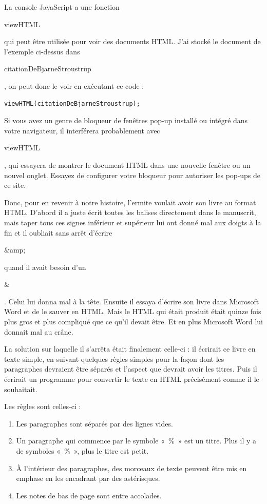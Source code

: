 \documentclass{FramateX}
\renewcommand{\texttt}[1]{\begin{sffamily}{#1}\end{sffamily}}
\begin{document}
\begin{center}\end{center}

La console JavaScript a une fonction \texttt{viewHTML} qui peut être
utilisée pour voir des documents HTML. J'ai stocké le document de
l'exemple ci-dessus dans \texttt{citationDeBjarneStroustrup}, on peut
donc le voir en exécutant ce code :

\begin{lstlisting}
viewHTML(citationDeBjarneStroustrup);
\end{lstlisting}
Si vous avez un genre de bloqueur de fenêtres pop-up installé ou intégré
dans votre navigateur, il interférera probablement avec
\texttt{viewHTML}, qui essayera de montrer le document HTML dans une
nouvelle fenêtre ou un nouvel onglet. Essayez de configurer votre
bloqueur pour autoriser les pop-ups de ce site.

\begin{center}\end{center}

Donc, pour en revenir à notre histoire, l'ermite voulait avoir son livre
au format HTML. D'abord il a juste écrit toutes les balises directement
dans le manuscrit, mais taper tous ces signes inférieur et supérieur lui
ont donné mal aux doigts à la fin et il oubliait sans arrêt d'écrire
\texttt{\&amp;} quand il avait besoin d'un \texttt{\&}. Celui lui donna
mal à la tête. Ensuite il essaya d'écrire son livre dans Microsoft Word
et de le sauver en HTML. Mais le HTML qui était produit était quinze
fois plus gros et plus compliqué que ce qu'il devait être. Et en plus
Microsoft Word lui donnait mal au crâne.

La solution sur laquelle il s'arrêta était finalement celle-ci : il
écrirait ce livre en texte simple, en suivant quelques règles simples
pour la façon dont les paragraphes devraient être séparés et l'aspect
que devrait avoir les titres. Puis il écrirait un programme pour
convertir le texte en HTML précisément comme il le souhaitait.

Les règles sont celles-ci :

\begin{enumerate}
\item
  Les paragraphes sont séparés par des lignes vides.
\item
  Un paragraphe qui commence par le symbole «~\%~» est un titre. Plus il
  y a de symboles «~\%~», plus le titre est petit.
\item
  À l'intérieur des paragraphes, des morceaux de texte peuvent être mis
  en emphase en les encadrant par des astérisques.
\item
  Les notes de bas de page sont entre accolades.
\end{enumerate}
\begin{center}\end{center}
\end{document}
